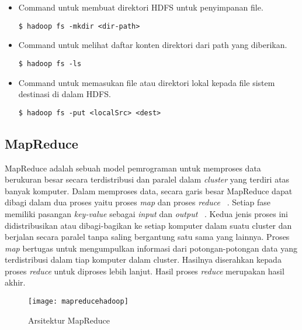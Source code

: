 \begin{itemize}
\item Command untuk membuat direktori HDFS untuk penyimpanan file.

\begin{verbatim}
$ hadoop fs -mkdir <dir-path>
\end{verbatim}
 
\item Command untuk melihat daftar konten direktori dari path yang diberikan.

\begin{verbatim}
$ hadoop fs -ls 
\end{verbatim}

\item Command untuk memasukan file atau direktori lokal kepada file sistem destinasi di dalam HDFS.

\begin{verbatim}
$ hadoop fs -put <localSrc> <dest> 
\end{verbatim}

\end{itemize}


\subsection{MapReduce}

MapReduce adalah sebuah model pemrograman untuk memproses data berukuran besar secara terdistribusi dan paralel dalam \textit{cluster} yang terdiri atas banyak komputer. Dalam memproses data, secara garis besar MapReduce dapat dibagi dalam dua proses yaitu proses \textit{map} dan proses \textit{reduce} ~\cite{tomwhite:05:htdg}. Setiap fase memiliki pasangan \textit{key-value} sebagai \textit{input} dan \textit{output} ~\cite{tomwhite:05:htdg}. Kedua jenis proses ini didistribusikan atau dibagi-bagikan ke setiap komputer dalam suatu cluster dan berjalan secara paralel tanpa saling bergantung satu sama yang lainnya. Proses \textit{map} bertugas untuk mengumpulkan informasi dari potongan-potongan data yang terdistribusi dalam tiap komputer dalam cluster. Hasilnya diserahkan kepada proses \textit{reduce} untuk diproses lebih lanjut. Hasil proses \textit{reduce} merupakan hasil akhir.\\

\begin{figure}[H]
    \centering  
    \texttt{[image: mapreducehadoop]}  
    \caption[Arsitektur MapReduce]{Arsitektur MapReduce} 
    \label{fig:mapreducehadoop} 
\end{figure}


